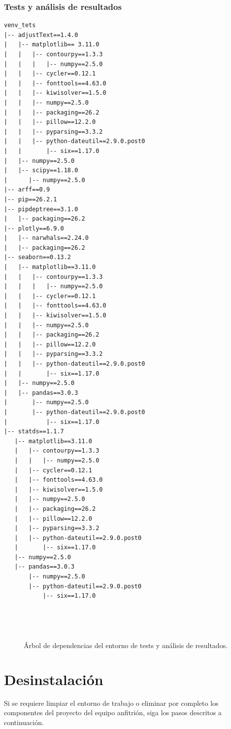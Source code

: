 \documentclass[a4paper,12pt,twoside,final]{book}
\begin{document}
\subsubsection{Tests y análisis de resultados}
\begin{verbatim}
venv_tets
|-- adjustText==1.4.0
|   |-- matplotlib== 3.11.0
|   |   |-- contourpy==1.3.3
|   |   |   |-- numpy==2.5.0
|   |   |-- cycler==0.12.1
|   |   |-- fonttools==4.63.0
|   |   |-- kiwisolver==1.5.0
|   |   |-- numpy==2.5.0
|   |   |-- packaging==26.2
|   |   |-- pillow==12.2.0
|   |   |-- pyparsing==3.3.2
|   |   |-- python-dateutil==2.9.0.post0
|   |       |-- six==1.17.0
|   |-- numpy==2.5.0
|   |-- scipy==1.18.0
|      |-- numpy==2.5.0
|-- arff==0.9
|-- pip==26.2.1
|-- pipdeptree==3.1.0
|   |-- packaging==26.2
|-- plotly==6.9.0
|   |-- narwhals==2.24.0
|   |-- packaging==26.2
|-- seaborn==0.13.2
|   |-- matplotlib==3.11.0
|   |   |-- contourpy==1.3.3
|   |   |   |-- numpy==2.5.0
|   |   |-- cycler==0.12.1
|   |   |-- fonttools==4.63.0
|   |   |-- kiwisolver==1.5.0
|   |   |-- numpy==2.5.0
|   |   |-- packaging==26.2
|   |   |-- pillow==12.2.0
|   |   |-- pyparsing==3.3.2
|   |   |-- python-dateutil==2.9.0.post0
|   |       |-- six==1.17.0
|   |-- numpy==2.5.0
|   |-- pandas==3.0.3
|       |-- numpy==2.5.0
|       |-- python-dateutil==2.9.0.post0
|           |-- six==1.17.0
|-- statds==1.1.7
   |-- matplotlib==3.11.0
   |   |-- contourpy==1.3.3
   |   |   |-- numpy==2.5.0
   |   |-- cycler==0.12.1
   |   |-- fonttools==4.63.0
   |   |-- kiwisolver==1.5.0
   |   |-- numpy==2.5.0
   |   |-- packaging==26.2
   |   |-- pillow==12.2.0
   |   |-- pyparsing==3.3.2
   |   |-- python-dateutil==2.9.0.post0
   |       |-- six==1.17.0
   |-- numpy==2.5.0
   |-- pandas==3.0.3
       |-- numpy==2.5.0
       |-- python-dateutil==2.9.0.post0
           |-- six==1.17.0
\end{verbatim}
\vspace{-2em}
\begin{figure}[ht]
  \centering
  \caption{Árbol de dependencias del entorno de tests y análisis de resultados.}
  \label{fig:dependencias_tests}
\end{figure}

\section{Desinstalación}
Si se requiere limpiar el entorno de trabajo o eliminar por completo los componentes del proyecto del equipo anfitrión,
siga los pasos descritos a continuación.
\end{document}
